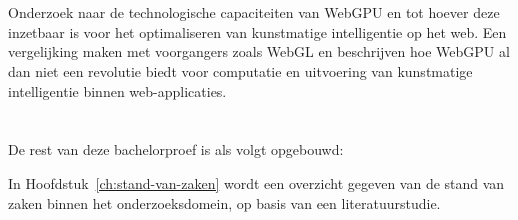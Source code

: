 \section{}%
\label{sec:onderzoeksvraag}


\section{}%
\label{sec:onderzoeksdoelstelling}


Onderzoek naar de technologische capaciteiten van WebGPU en tot hoever deze inzetbaar is voor het optimaliseren van kunstmatige intelligentie op het web. Een vergelijking maken met voorgangers zoals WebGL en beschrijven hoe WebGPU al dan niet een revolutie biedt voor computatie en uitvoering van kunstmatige intelligentie binnen web-applicaties.

\break{}

\section{}%
\label{sec:opzet-bachelorproef}


De rest van deze bachelorproef is als volgt opgebouwd:

In Hoofdstuk~\ref{ch:stand-van-zaken} wordt een overzicht gegeven van de stand van zaken binnen het onderzoeksdomein, op basis van een literatuurstudie.

